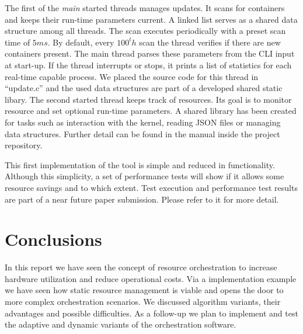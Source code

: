 \documentclass[]{scrartcl}
\begin{document}
The first of the \emph{main} started threads manages updates. It scans for containers and keeps their run-time parameters current.  
A linked list serves as a shared data structure among all threads. 
The scan executes periodically with a preset scan time of $5ms$. 
By default, every $100^th$ scan the thread verifies if there are new containers present.
The main thread parses these parameters from the CLI input at start-up.
If the thread interrupts or stops, it prints a list of statistics for each real-time capable process.
We placed the source code for this thread in ``update.c'' and the used data structures are part of a developed shared static libary. 
The second started thread keeps track of resources. Its goal is to monitor resource and set optional run-time parameters.
A shared library has been created for tasks such as interaction with the kernel, reading JSON files or managing data structures.
Further detail can be found in the manual inside the project repository.

This first implementation of the tool is simple and reduced in functionality. Although this simplicity, a set of performance tests will show if it allows some resource savings and to which extent.
Test execution and performance test results are part of a near future paper submission. Please refer to it for more detail.

\section{Conclusions}
\label{sec:conclusions}

In this report we have seen the concept of resource orchestration to increase hardware utilization and reduce operational costs.
Via a implementation example we have seen how static resource management is viable and opens the door to more complex orchestration scenarios. 
We discussed algorithm variants, their advantages and possible difficulties.
As a follow-up we plan to implement and test the adaptive and dynamic variants of the orchestration software.



\end{document}
